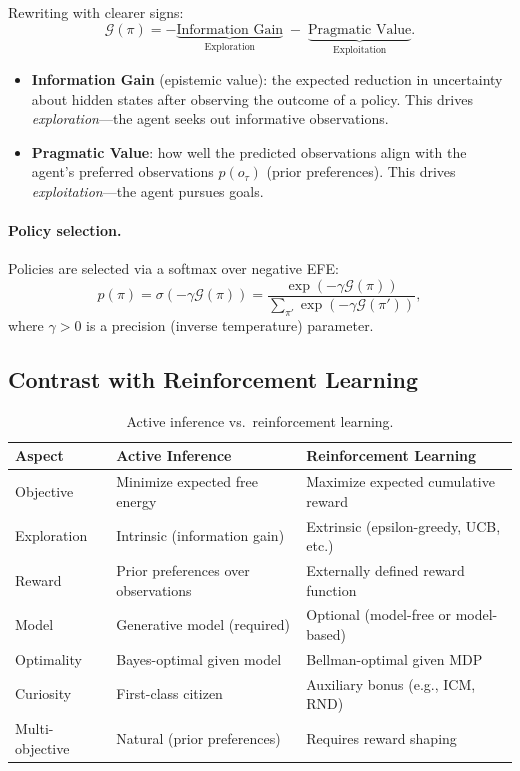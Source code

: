 \documentclass[11pt,a4paper]{article}
\theoremstyle{definition}
\newcommand{\cG}{\mathcal{G}}
\begin{document}
Rewriting with clearer signs:
\begin{equation}
  \boxed{
  \cG(\pi) = -\underbrace{\text{Information Gain}}_{\text{Exploration}}
           \;-\; \underbrace{\text{Pragmatic Value}}_{\text{Exploitation}}.
  }
  \label{eq:efe_decomp}
\end{equation}

\begin{itemize}[leftmargin=2em]
  \item \textbf{Information Gain} (epistemic value): the expected reduction in
    uncertainty about hidden states after observing the outcome of a policy.
    This drives \emph{exploration}---the agent seeks out informative observations.
  \item \textbf{Pragmatic Value}: how well the predicted observations align
    with the agent's preferred observations $p(o_\tau)$ (prior preferences).
    This drives \emph{exploitation}---the agent pursues goals.
\end{itemize}

\paragraph{Policy selection.}
Policies are selected via a softmax over negative EFE:
\begin{equation}
  p(\pi) = \sigma(-\gamma \cG(\pi))
  = \frac{\exp(-\gamma \cG(\pi))}{\sum_{\pi'} \exp(-\gamma \cG(\pi'))},
  \label{eq:policy_select}
\end{equation}
where $\gamma > 0$ is a precision (inverse temperature) parameter.

\subsection{Contrast with Reinforcement Learning}

\begin{table}[h]
\centering
\small
\begin{tabular}{@{}lll@{}}
\toprule
\textbf{Aspect} & \textbf{Active Inference} & \textbf{Reinforcement Learning} \\
\midrule
Objective & Minimize expected free energy & Maximize expected cumulative reward \\
Exploration & Intrinsic (information gain) & Extrinsic (epsilon-greedy, UCB, etc.) \\
Reward & Prior preferences over observations & Externally defined reward function \\
Model & Generative model (required) & Optional (model-free or model-based) \\
Optimality & Bayes-optimal given model & Bellman-optimal given MDP \\
Curiosity & First-class citizen & Auxiliary bonus (e.g., ICM, RND) \\
Multi-objective & Natural (prior preferences) & Requires reward shaping \\
\bottomrule
\end{tabular}
\caption{Active inference vs.\ reinforcement learning.}
\label{tab:aif_rl}
\end{table}
\end{document}
